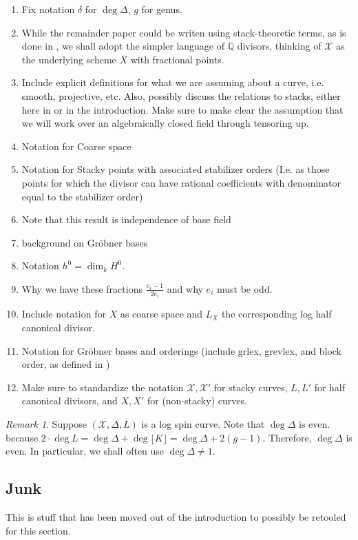 \documentclass{amsart}
\theoremstyle{plain}
\theoremstyle{definition}
\theoremstyle{remark}
\newtheorem{rem}[thm]{Remark}
\numberwithin{equation}{section}
\newcommand\BQ{{\mathbb Q}}
\newcommand \sx{\mathscr X}
\begin{document}
\begin{enumerate}
	\item Fix notation $\delta$ for $\deg \Delta$, $g$ for genus.
	\item While the remainder paper could be writen using stack-theoretic terms, as is done in \cite{vzb:stacky}, we shall adopt the simpler language of $\BQ$ divisors, thinking of $\sx$ as the underlying scheme $X$ with fractional points.
	\item Include explicit definitions for what we are assuming about a curve, i.e. smooth, projective, etc. Also, possibly discuss the relations to stacks, either here in or in the introduction. Make sure to make clear the assumption that we will work over an algebraically closed field through tensoring up.
	\item Notation for Coarse space
	\item Notation for Stacky points with associated stabilizer orders (I.e. as those points for which the divisor can have rational coefficients with denominator equal to the stabilizer order)
	\item Note that this result is independence of base field
	\item background on Gr\"{o}bner bases
	\item Notation $h^0 = \dim_k H^0$.
	\item Why we have these fractions $\frac{e_i - 1}{2e_i}$ and why $e_i$ must be odd.
	\item Include notation for $X$ as coarse space and $L_X$ the corresponding log half canonical divisor.
	\item Notation for Gr\"{o}bner bases and orderings (include grlex, grevlex, and block order, as defined in \cite[Definition 8.1.1]{vzb:stacky})
	\item Make sure to standardize the notation $\sx,\sx'$ for stacky curves, $L,L'$ for half canonical divisors, and $X,X'$ for (non-stacky) curves.
\end{enumerate}

\begin{rem}
\label{rem:delta-not-1}
Suppose $(\sx,\Delta,L)$ is a log spin curve. Note that $\deg \Delta
$ is even. because $2 \cdot \deg L = \deg \Delta + \deg \lfloor K
\rfloor = \deg \Delta + 2(g-1).$ Therefore, $\deg \Delta$ is even.
In particular, we shall often use $\deg \Delta \neq 1$.
\end{rem}



\subsection{Junk}
This is stuff that has been moved out of the introduction to possibly
be retooled for this section.
\end{document}
